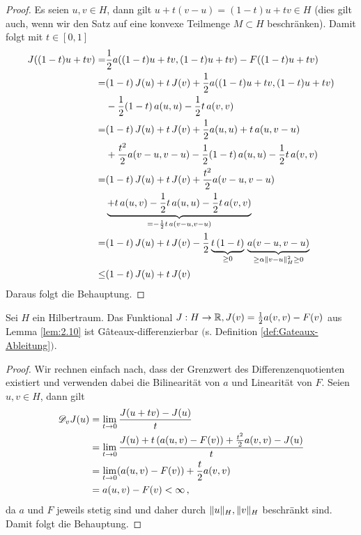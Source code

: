 \begin{proof}
Es seien $u,v \in H$, dann gilt $u + t(v-u) = (1-t)u + tv \in H$ (dies gilt auch, wenn wir den Satz auf eine konvexe Teilmenge $M \subset H$ beschränken). Damit folgt mit $t \in [0,1]$
\begin{align*}
	J((1-t)u+tv)  = & \frac 1 2 a((1-t)u+tv,(1-t)u+tv) - F((1-t)u+tv) \\
	= &(1-t) \, J(u) + t \, J(v) +  \frac 1 2 a((1-t)u+tv,(1-t)u+tv) \\
	 & - \frac 1 2(1-t) \, a(u,u)-\frac 1 2 t \, a(v,v) \\
	= & (1-t) \, J(u) + t \, J(v)  + \frac 1 2 a(u,u) + t \, a(u,v-u)  \\
	&+ \frac {t^2} 2 a(v-u,v-u) - \frac 12 (1-t)\, a(u,u) -\frac 1 2 t \, a(v,v) \\
	= & (1-t) \, J(u) + t \, J(v) + \frac {t^2} 2 a(v-u,v-u)  \\
	 &\underbrace{+ t \, a(u,v)  - \frac 12 t\, a(u,u) -\frac 1 2 t \, a(v,v) }_{=  -\frac 1 2 t\, a(v-u,v-u)}\\
	= &  (1-t) \, J(u) + t \, J(v) - \frac {1} 2 \underbrace{t \, (1-t)}_{\ge 0} \,\underbrace{ a(v-u,v-u) }_{\ge \alpha  \norm{v-u}_H^2 \ge 0} \\
	\le &   (1-t) \, J(u) + t \, J(v) \, %
\end{align*}
Daraus folgt die Behauptung.
\end{proof}


\begin{lemma} \label{lem:2.11}
Sei $H$ ein Hilbertraum. Das Funktional $J: H \rightarrow \mathbb{R}, J(v) =\frac 1 2 a(v,v)-F(v)$ aus Lemma \ref{lem:2.10} ist Gâteaux-differenzierbar $($s. Definition \ref{def:Gateaux-Ableitung}$)$.
\end{lemma}

\begin{proof}
Wir rechnen einfach nach, dass der Grenzwert des Differenzenquotienten existiert und verwenden dabei die Bilinearität von $a$ und Linearität von $F$. Seien $u,v \in H$, dann gilt
\begin{align*}
	\mathscr D_v J(u) & = \lim_{t\rightarrow 0} \frac{J(u+tv)-J(u)}t \\ 
	&= \lim_{t\rightarrow 0} \frac{J(u) + t \, (a(u,v)-F(v)) + \frac {t^2}2 a(v,v)-J(u)}t \\
	& =  \lim_{t\rightarrow 0}  (a(u,v)-F(v)) + \frac {t}2 a(v,v) \\
	& = a(u,v)-F(v) < \infty\, ,
\end{align*}
da $a$ und $F$ jeweils stetig sind und daher durch $\lVert u\rVert_H,\lVert v\rVert_H$ beschränkt sind. Damit folgt die Behauptung.
\end{proof}


